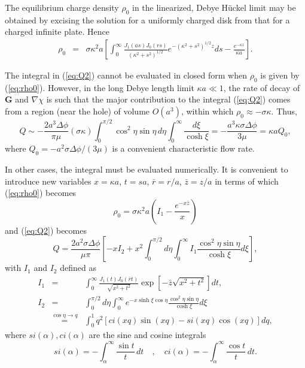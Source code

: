 The equilibrium charge density $\rho_0$ in the linearized, Debye H\"{u}ckel limit may be obtained by excising the solution for a uniformly charged disk  \cite{Sherwood1995} from that for a charged infinite plate. 
Hence
\begin{eqnarray}
\rho_0 & = & \sigma  \kappa^2 a \left[  \int_0^\infty
\frac{J_1(as)J_0(rs)}{(\kappa^2+s^2)^{1/2}}
e^{-(\kappa^2+s^2)^{1/2} z} ds - \frac{e^{-\kappa z}}{\kappa a} \right].
\label{eq:rho0}
\end{eqnarray}

The integral in (\ref{eq:Q2}) cannot be evaluated in closed form when $\rho_0$ is given by (\ref{eq:rho0}). However, in the long Debye length limit  $\kappa a \ll 1$, the rate of decay of $\mathbf{G}$ and $\nabla \chi$ is such that the major contribution to the integral (\ref{eq:Q2}) comes from a region (near the hole) of volume $O(a^3)$, within which $\rho_0 \approx -\sigma\kappa$. Thus,
\begin{equation}
Q \sim - \frac{2a^3\Delta\phi}{\pi\mu} (\sigma \kappa)
\int_0^{\pi/2} \cos^2\eta \sin\eta \, d\eta \int_0^\infty
\frac{d\xi}{\cosh\xi} = - \frac{a^3\kappa\sigma\Delta\phi}{3\mu} = \kappa a Q_{0},
\label{eq:QaKappaSmall}
\end{equation}
where $Q_{0}= - a^2 \sigma\Delta\phi/ (3\mu)$ is a convenient characteristic flow rate.

In other cases, the integral must be evaluated numerically. It is convenient to introduce new variables 
$x=\kappa a$, $t=sa$, $\bar{r} = r/a$, $\bar{z} = z/a$ in terms of which (\ref{eq:rho0}) becomes
\begin{equation}
\rho_0 = \sigma\kappa^2 a \left(I_1 - \frac{e^{-x\bar{z}}}{x} \right)
\label{eq:rho0_modified}
\end{equation}
and (\ref{eq:Q2}) becomes 
\begin{equation}
Q = \frac{2a^2 \sigma \Delta\phi}{\mu\pi} \left[ - x
I_2 + x^2 \int_0^{\pi/2} d\eta \int_0^\infty I_1
\frac{\cos^2\eta\sin\eta}{\cosh\xi} d\xi \right],
\label{eq:Q3}
\end{equation}
with $I_1$ and $I_2$ defined as 
\begin{eqnarray} 
I_1 &=& \int_0^\infty
\frac{J_1(t)J_0(\bar{r}t)}{\sqrt{x^2+t^2}}
\exp[ - \bar{z} \sqrt{x^2+t^2}   ] dt, 
\label{eq:I1_define}
\\ 
I_2 &=& \int_0^{\pi/2}d\eta \int_0^\infty e^{-x\sinh\xi\cos\eta} \frac{\cos^2\eta\sin\eta}{\cosh\xi} d\xi \nonumber \\
    &\overset{\cos\eta\rightarrow q}{=}&  \int_0^1 q^2 \left[
ci(x q)\sin(x q )- si(x q )\cos(x q) \right] d q,
\label{eq:expTermInt}
\end{eqnarray}
where $si(\alpha), ci(\alpha)$ are the sine and cosine integrals 
\begin{equation}
si(\alpha) = - \int_\alpha^\infty \frac{\sin t}{t}\, dt\quad , \quad
ci(\alpha) = -\int_\alpha^\infty \frac{\cos t}{t}\,dt.
\end{equation}

